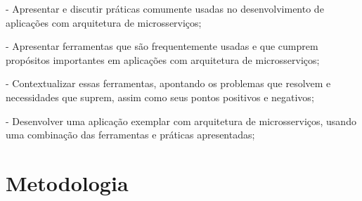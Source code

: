 - Apresentar e discutir práticas comumente usadas no desenvolvimento de aplicações com arquitetura de microsserviços;






- Apresentar ferramentas que são frequentemente usadas e que cumprem propósitos importantes em aplicações com arquitetura de microsserviços;

- Contextualizar essas ferramentas, apontando os problemas que resolvem e necessidades que suprem, assim como seus pontos positivos e negativos;

- Desenvolver uma aplicação exemplar com arquitetura de microsserviços, usando uma combinação das ferramentas e práticas apresentadas;



\section{Metodologia}

